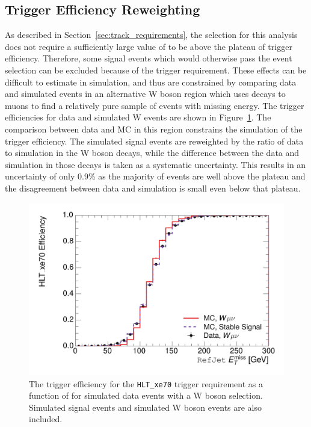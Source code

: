 \subsection{Trigger Efficiency Reweighting}
As described in Section~\ref{sec:track_requirements}, the selection for this analysis does not require a sufficiently large value of \met to be above the plateau of trigger efficiency.
Therefore, some signal events which would otherwise pass the event selection can be excluded because of the trigger requirement.
These effects can be difficult to estimate in simulation, and thus are constrained by comparing data and simulated events in an alternative W boson region which uses decays to muons to find a relatively pure sample of events with missing energy.
The trigger efficiencies for data and simulated W events are shown in Figure~\ref{fig:trigger_turnon_calo}.
The comparison between data and MC in this region constrains the simulation of the trigger efficiency.
The simulated signal events are reweighted by the ratio of data to simulation in the W boson decays, while the difference between the data and simulation in those decays is taken as a systematic uncertainty.
This results in an uncertainty of only 0.9\% as the majority of events are well above the plateau and the disagreement between data and simulation is small even below that plateau.

\begin{figure}[h]
\centering
\includegraphics[width=\fullfig]{figures/hlt_xe70_calomet.png}
\caption{The trigger efficiency for the \texttt{HLT\_xe70} trigger requirement as a function of \calomet for simulated data events with a W boson selection. Simulated signal events and simulated W boson events are also included.}
\label{fig:trigger_turnon_calo}
\end{figure}

